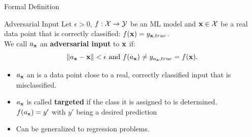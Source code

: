 \documentclass[11pt,compress,t,notes=noshow, aspectratio=169, xcolor=table]{beamer}
\begin{document}
\begin{vbframe}[c]{Formal Definition}
\begin{block}{Adversarial Input}
Let $\epsilon>0$, $f:\Xspace \rightarrow \Yspace$ be an ML model and $\xv \in \Xspace$ be a real data point that is correctly classified: $f(\xv)=y_{\xv,true}$. \\ 
 We call $a_{\xv}$ an \textbf{adversarial input} to $\xv$ if:
\begin{equation*}
    \| a_{\xv}- \xv\|<\epsilon\text{ and } f(a_{\xv})\neq y_{a_{\xv},true}=f(\xv).
\end{equation*}
\end{block}
\begin{itemize}
    \item $a_{\xv}$ an is a data point close to a real, correctly classified input that is misclassified.
    \item $a_{\xv}$ is called \textbf{targeted} if the class it is assigned to is determined.\\
    $f(a_{\xv})=y'$ with $y'$ being a desired prediction
    \item Can be generalized to regression problems.
\end{itemize}
\end{vbframe}


\end{document}
